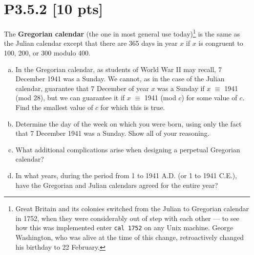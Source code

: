 \documentclass[12pt]{article}
\begin{document}
\newpage
\section*{\textbf{P3.5.2} [10 pts]}
The \textbf{Gregorian calendar} (the one in most general use today)\footnote{Great Britain and its colonies switched from the Julian to Gregorian calendar in 1752, when they were considerably out of step with each other — to see how this was implemented enter \texttt{cal 1752} on any Unix machine. George Washington, who was alive at the time of this change, retroactively changed his birthday to 22 February.} is the same as the Julian calendar except that there are 365 days in year $x$ if $x$ is congruent to 100, 200, or 300 modulo 400.

\begin{enumerate}[(a)]
    \item In the Gregorian calendar, as students of World War II may recall, 7 December 1941 was a Sunday. We cannot, as in the case of the Julian calendar, guarantee that 7 December of year $x$ was a Sunday if $x$ $\equiv$ 1941 (mod 28), but we can guarantee it if $x$ $\equiv$ 1941 (mod $c$) for some value of $c$. Find the smallest value of $c$ for which this is true.


    \item Determine the day of the week on which you were born, using only the fact that 7 December 1941 was a Sunday. Show all of your reasoning.


    \item What additional complications arise when designing a perpetual Gregorian calendar? 


    \item In what years, during the period from 1 to 1941 A.D. (or 1 to 1941 C.E.), have the Gregorian and Julian calendars agreed for the entire year?

\end{enumerate}
\end{document}
